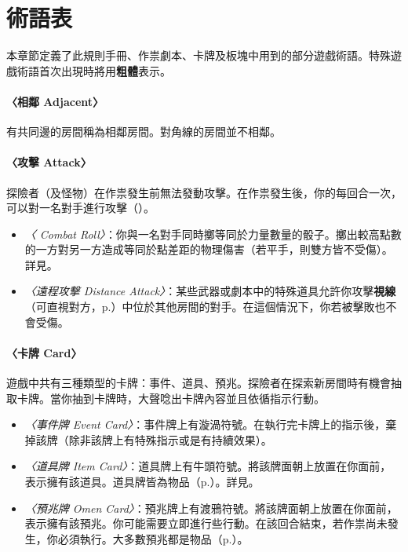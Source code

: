 
\section{術語表} \label{sec:glossary}

本章節定義了此規則手冊、作祟劇本、卡牌及板塊中用到的部分遊戲術語。特殊遊戲術語首次出現時將用\textbf{粗體}表示。

\paragraph{〈相鄰 Adjacent〉}
有共同邊的房間稱為相鄰房間。對角線的房間並不相鄰。

\paragraph{〈攻擊 Attack〉}
探險者（及怪物）在作祟發生前無法發動攻擊。在作祟發生後，你的每回合一次，可以對一名對手進行攻擊（）。

\begin{itemize}
	\item \textit{〈 Combat Roll〉}：你與一名對手同時擲等同於力量數量的骰子。擲出較高點數的一方對另一方造成等同於點差距的物理傷害（若平手，則雙方皆不受傷）。詳見。
	\item \textit{〈遠程攻擊 Distance Attack〉}：某些武器或劇本中的特殊道具允許你攻擊\textbf{視線}（可直視對方，p.\pageref{glossary:line-of-sight}）中位於其他房間的對手。在這個情況下，你若被擊敗也不會受傷。
\end{itemize}

\paragraph{〈卡牌 Card〉}
遊戲中共有三種類型的卡牌：事件、道具、預兆。探險者在探索新房間時有機會抽取卡牌。當你抽到卡牌時，大聲唸出卡牌內容並且依循指示行動。

\begin{itemize}
	\item \textit{〈事件牌 Event Card〉}：事件牌上有漩渦符號\EventSymbol{}。在執行完卡牌上的指示後，棄掉該牌（除非該牌上有特殊指示或是有持續效果）。
	\item \textit{〈道具牌 Item Card〉}：道具牌上有牛頭符號\ItemSymbol{}。將該牌面朝上放置在你面前，表示擁有該道具。道具牌皆為物品（p.\pageref{glossary:item}）。詳見。
	\item \textit{〈預兆牌 Omen Card〉}：預兆牌上有渡鴉符號\OmenSymbol{}。將該牌面朝上放置在你面前，表示擁有該預兆。你可能需要立即進行些行動。在該回合結束，若作祟尚未發生，你必須執行。大多數預兆都是物品（p.\pageref{glossary:item}）。
\end{itemize}

